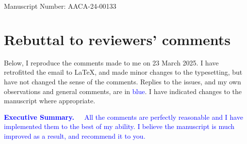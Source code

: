 \documentclass{article}
\begin{document}
Manuscript Number: AACA-24-00133

\section*{Rebuttal to reviewers' comments}

Below, I reproduce the comments made to me on 23 March 2025.  I have
retrofitted the email to \LaTeX, and made minor changes to the
typesetting, but have not changed the sense of the comments.  Replies
to the issues, and my own observations and general comments, are in
\textcolor{blue}{blue}.  I have indicated changes to the manuscript
where appropriate.\\

\vspace*{1cm}

\noindent\textcolor{blue}{{\bf Executive Summary.\ \ } All the
  comments are perfectly reasonable and I have implemented them to the
  best of my ability.  I believe the manuscript is much improved as a
  result, and recommend it to you.}
\vspace*{1cm}
\end{document}
